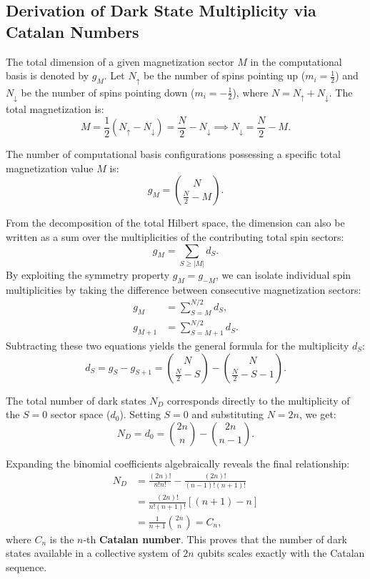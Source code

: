 \documentclass[aps,superscriptaddress,twocolumn,pre,longbibliography,floatfix]{revtex4-1}
\begin{document}
	\subsection{Derivation of Dark State Multiplicity via Catalan Numbers}
	\label{Der_Dark_state}
	The total dimension of a given magnetization sector $M$ in the computational basis is denoted by $g_M$. Let $N_{\uparrow}$ be the number of spins pointing up ($m_i = \frac{1}{2}$) and $N_{\downarrow}$ be the number of spins pointing down ($m_i = -\frac{1}{2}$), where $N = N_{\uparrow} + N_{\downarrow}$. The total magnetization is:
	\begin{equation}
		M = \frac{1}{2}(N_{\uparrow} - N_{\downarrow}) = \frac{N}{2} - N_{\downarrow} \implies N_{\downarrow} = \frac{N}{2} - M.
	\end{equation}
	
	The number of computational basis configurations possessing a specific total magnetization value $M$ is:
	\begin{equation}
		g_M = \binom{N}{\frac{N}{2} - M}.
	\end{equation}
	
	From the decomposition of the total Hilbert space, the dimension can also be written as a sum over the multiplicities of the contributing total spin sectors:
	\begin{equation}
		g_M = \sum_{S \geq |M|} d_S.
	\end{equation}
	By exploiting the symmetry property $g_{M} = g_{-M}$, we can isolate individual spin multiplicities by taking the difference between consecutive magnetization sectors:
	\begin{align}
		g_M &= \sum_{S=M}^{N/2} d_S, \\
		g_{M+1} &= \sum_{S=M+1}^{N/2} d_S.
	\end{align}
	Subtracting these two equations yields the general formula for the multiplicity $d_S$:
	\begin{equation}\label{ds_multi}
		d_S = g_S - g_{S+1} = \binom{N}{\frac{N}{2} - S} - \binom{N}{\frac{N}{2} - S - 1}.
	\end{equation}
	
	The total number of dark states $N_D$ corresponds directly to the multiplicity of the $S = 0$ sector space ($d_0$). Setting $S = 0$ and substituting $N = 2n$, we get:
	\begin{equation}\label{DSNAP}
		N_D = d_0 = \binom{2n}{n} - \binom{2n}{n-1}.
	\end{equation}
	
	Expanding the binomial coefficients algebraically reveals the final relationship:
	\begin{align}\label{CATALAN}
		N_D &= \frac{(2n)!}{n!n!} - \frac{(2n)!}{(n-1)!(n+1)!} \nonumber \\
		&= \frac{(2n)!}{n!(n+1)!} \left[ (n+1) - n \right] \nonumber \\
		&= \frac{1}{n+1}\binom{2n}{n} = C_n,
	\end{align}
	where $C_n$ is the $n$-th \textbf{Catalan number}. This proves that the number of dark states available in a collective system of $2n$ qubits scales exactly with the Catalan sequence.
\end{document}
